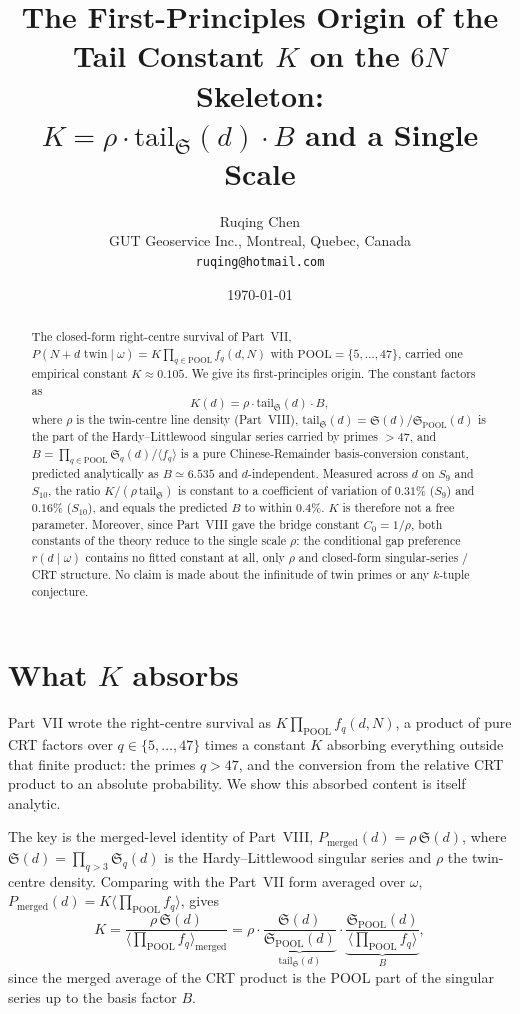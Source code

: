 \documentclass[11pt]{article}
\title{The First-Principles Origin of the Tail Constant $K$ on the $6N$ Skeleton:\\
$K=\rho\cdot\mathrm{tail}_{\mathfrak S}(d)\cdot B$ and a Single Scale}
\author{Ruqing Chen\\
\small GUT Geoservice Inc., Montreal, Quebec, Canada\\
\small \texttt{ruqing@hotmail.com}}
\date{\today}
\begin{document}
\maketitle

\begin{abstract}
The closed-form right-centre survival of Part~VII,
$P(N{+}d\text{ twin}\mid\omega)=K\prod_{q\in\mathrm{POOL}}f_q(d,N)$ with
$\mathrm{POOL}=\{5,\dots,47\}$, carried one empirical constant $K\approx0.105$.
We give its first-principles origin. The constant factors as
\[
  K(d)=\rho\cdot\mathrm{tail}_{\mathfrak S}(d)\cdot B,
\]
where $\rho$ is the twin-centre line density (Part~VIII),
$\mathrm{tail}_{\mathfrak S}(d)=\mathfrak{S}(d)/\mathfrak{S}_{\mathrm{POOL}}(d)$
is the part of the Hardy--Littlewood singular series carried by primes $>47$, and
$B=\prod_{q\in\mathrm{POOL}}\mathfrak{S}_q(d)/\langle f_q\rangle$ is a pure
Chinese-Remainder basis-conversion constant, predicted analytically as
$B\simeq6.535$ and $d$-independent. Measured across $d$ on $S_9$ and $S_{10}$, the
ratio $K/(\rho\,\mathrm{tail}_{\mathfrak S})$ is constant to a coefficient of
variation of $0.31\%$ ($S_9$) and $0.16\%$ ($S_{10}$), and equals the predicted
$B$ to within $0.4\%$. $K$ is therefore not a free parameter. Moreover, since
Part~VIII gave the bridge constant $C_0=1/\rho$, both constants of the theory
reduce to the single scale $\rho$: the conditional gap preference $r(d\mid\omega)$
contains no fitted constant at all, only $\rho$ and closed-form
singular-series / CRT structure. No claim is made about the infinitude of twin
primes or any $k$-tuple conjecture.
\end{abstract}

\section{What $K$ absorbs}

Part~VII wrote the right-centre survival as $K\prod_{\mathrm{POOL}}f_q(d,N)$, a
product of pure CRT factors over $q\in\{5,\dots,47\}$ times a constant $K$
absorbing everything outside that finite product: the primes $q>47$, and the
conversion from the relative CRT product to an absolute probability. We show this
absorbed content is itself analytic.

The key is the merged-level identity of Part~VIII, $P_{\mathrm{merged}}(d)=
\rho\,\mathfrak{S}(d)$, where $\mathfrak{S}(d)=\prod_{q>3}\mathfrak{S}_q(d)$ is the
Hardy--Littlewood singular series and $\rho$ the twin-centre density. Comparing
with the Part~VII form averaged over $\omega$,
$P_{\mathrm{merged}}(d)=K\langle\prod_{\mathrm{POOL}}f_q\rangle$, gives
\[
  K=\frac{\rho\,\mathfrak{S}(d)}{\langle\prod_{\mathrm{POOL}}f_q\rangle_{\mathrm{merged}}}
   =\rho\cdot\underbrace{\frac{\mathfrak{S}(d)}{\mathfrak{S}_{\mathrm{POOL}}(d)}}_{\mathrm{tail}_{\mathfrak S}(d)}
    \cdot\underbrace{\frac{\mathfrak{S}_{\mathrm{POOL}}(d)}{\langle\prod_{\mathrm{POOL}}f_q\rangle}}_{B},
\]
since the merged average of the CRT product is the POOL part of the singular
series up to the basis factor $B$.
\end{document}
